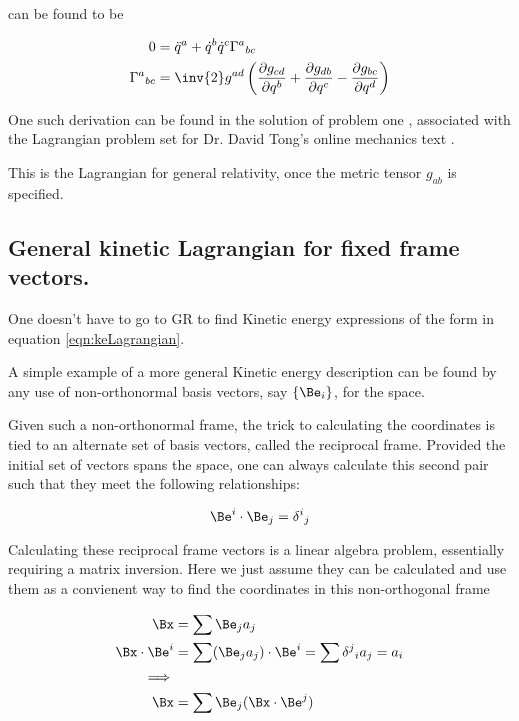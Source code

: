 \documentclass{article}      %
\newcommand{\PD}[2]{\frac{\partial {#2}}{\partial {#1}}}
\newcommand{\qdot}[0]{\dot{q}}
\newcommand{\qddot}[0]{\ddot{q}}
\begin{document}
can be found to be

\begin{align}
0
&= \qddot^a + \qdot^b \qdot^c {\Gamma^a}_{b c} \\
{\Gamma^a}_{b c} &= \inv{2} g^{a d} \left( 
\PD{q^b}{g_{c d}} 
+ \PD{q^c}{g_{d b}} 
- \PD{q^d}{g_{b c}} 
\right)
\end{align}

One such derivation can be found in
the solution of problem one \cite{PJTongMf1}, associated with the 
Lagrangian problem set for
Dr. David Tong's online mechanics text \cite{TongDynamics}.

This is the Lagrangian for general relativity, once the metric tensor $g_{a b}$ is specified.

\subsection{ General kinetic Lagrangian for fixed frame vectors. }

One doesn't have to go to GR to find Kinetic energy expressions of the form in equation \ref{eqn:keLagrangian}.

A simple example of a more general Kinetic energy description can be found by any use of non-orthonormal basis vectors, say $\{\Be_i\}$,
for the space.

Given such a non-orthonormal frame, the trick to calculating the coordinates is tied to an alternate set of basis vectors, called the reciprocal frame.
Provided the initial set of vectors spans the space, one can always calculate this second pair such that they meet the following relationships:

\begin{equation*}
\Be^i \cdot \Be_j = {\delta^i}_j
\end{equation*}

Calculating these reciprocal frame vectors is a linear algebra problem, essentially requiring a matrix inversion.  Here we just assume they can be calculated and use them as a convienent way to find the coordinates in this non-orthogonal frame

\begin{align*}
\Bx &= \sum \Be_j a_j \\
\Bx \cdot \Be^i &= \sum (\Be_j a_j) \cdot \Be^i = \sum {\delta^j}_i a_j = a_i \\
\implies \\
\Bx &= \sum \Be_j (\Bx \cdot \Be^j)
\end{align*}
\end{document}
